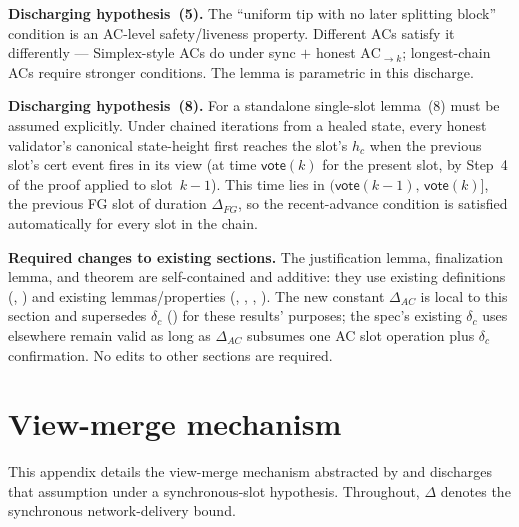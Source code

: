 \ifx\litemode\undefined\documentclass{article}\fi
\newcommand{\vote}{\mathsf{vote}}
\renewcommand{\paragraph}[1]{\vspace{7pt}\noindent\textbf{#1}}
\theoremstyle{plain}
\theoremstyle{definition}
\theoremstyle{remark}
\begin{document}
\paragraph{Discharging hypothesis~(5).} The ``uniform tip with no later splitting block'' condition is an AC-level safety/liveness property. Different ACs satisfy it differently --- Simplex-style ACs do under sync $+$ honest $\mathrm{AC}_{\to k}$; longest-chain ACs require stronger conditions. The lemma is parametric in this discharge.

\paragraph{Discharging hypothesis~(8).} For a standalone single-slot lemma~(8) must be assumed explicitly. Under chained iterations from a healed state, every honest validator's canonical state-height first reaches the slot's $h_c$ when the previous slot's cert event fires in its view (at time $\vote(k)$ for the present slot, by Step~4 of the proof applied to slot~$k-1$). This time lies in $(\vote(k-1),\, \vote(k)]$, the previous FG slot of duration $\Delta_{FG}$, so the recent-advance condition is satisfied automatically for every slot in the chain.

\paragraph{Required changes to existing sections.} The justification lemma, finalization lemma, and theorem are self-contained and additive: they use existing definitions (, ) and existing lemmas/properties (, , , ). The new constant $\Delta_{AC}$ is local to this section and supersedes $\delta_c$ () for these results' purposes; the spec's existing $\delta_c$ uses elsewhere remain valid as long as $\Delta_{AC}$ subsumes one AC slot operation plus $\delta_c$ confirmation. No edits to other sections are required.

\appendix

\section{View-merge mechanism}\label{app:view-merge}

This appendix details the view-merge mechanism abstracted by  and discharges that assumption under a synchronous-slot hypothesis.
Throughout, $\Delta$ denotes the synchronous network-delivery bound.
\end{document}
